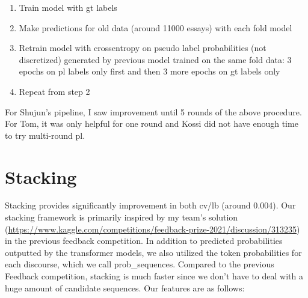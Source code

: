 \documentclass[11pt]{article} %
\begin{document}
\begin{enumerate}

\item Train model with gt labels
\item Make predictions for old data (around 11000 essays) with each fold model
\item Retrain model with crossentropy on pseudo label probabilities (not discretized) generated by previous model trained on the same fold data: 3 epochs on pl labels only first and then 3 more epochs on gt labels only
\item Repeat from step 2
\end{enumerate}

For Shujun's pipeline, I saw improvement until 5 rounds of the above procedure. For Tom, it was only helpful for one round and Kossi did not have enough time to try multi-round pl.

\section{Stacking}
Stacking provides significantly improvement in both cv/lb (around 0.004). Our stacking framework is primarily inspired by my team's solution (\url{https://www.kaggle.com/competitions/feedback-prize-2021/discussion/313235}) in the previous feedback competition. In addition to predicted probabilities outputted by the transformer models, we also utilized the token probabilities for each discourse, which we call prob\_sequences. Compared to the previous Feedback competition, stacking is much faster since we don't have to deal with a huge amount of candidate sequences. Our features are as follows:
\end{document}
